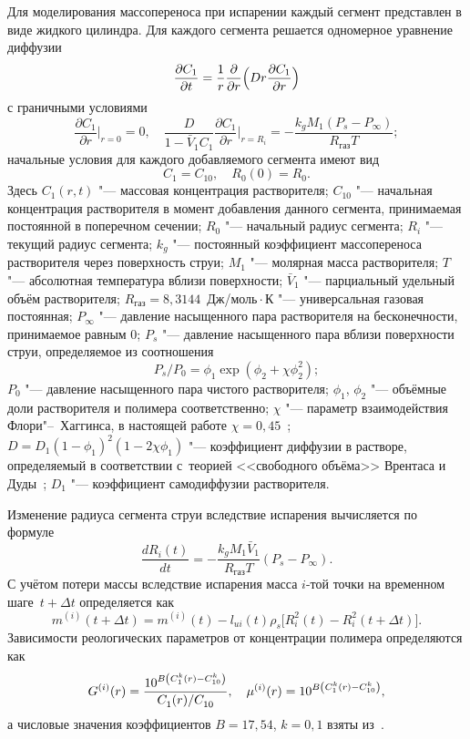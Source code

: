 Для моделирования массопереноса при испарении каждый сегмент представлен в виде жидкого цилиндра. 
Для каждого сегмента решается одномерное уравнение диффузии
\begin{equation}
\label{uravnenie3}
\frac{{\partial C_1 }}{{\partial t}} = \frac{1}{r}\frac{\partial }{{\partial r}}\Bigl( {Dr\frac{{\partial C_1 }}{{\partial r}}} \Bigr)
\end{equation}
с граничными условиями
$$
\frac{{\partial C_1 }}{{\partial r}}\Bigr|_{ r = 0} = 0, \quad
\frac{D}{{1 - \bar V_1 C_1 }}\frac{{\partial C_1 }}{{\partial r}}\Bigr|_{ r = R_i} =  - \frac{{k_g M_1 \left( {P_s  - P_\infty  } \right)}}{{R_{\text{газ}} T}};
$$
начальные условия для каждого добавляемого сегмента имеют вид
$$
C_1  = C_{10} ,\quad R_0 ( 0 ) = R_0.
$$
Здесь $C_1 (r, t)$ "--- массовая концентрация растворителя;
$C_{10}$ "--- начальная концентрация растворителя в момент добавления данного сегмента, принимаемая постоянной в поперечном сечении; 
$R_0$ "--- начальный радиус сегмента; 
$R_i$ "--- текущий радиус сегмента;
$k_g$ "--- постоянный коэффициент массопереноса растворителя через поверхность струи;
$M_1$ "--- молярная масса растворителя;
$T$ "--- абсолютная температура вблизи поверхности;
$\bar V_1$ "--- парциальный удельный объём растворителя;
$R_{\text{газ}}  = 8,3144$~Дж/моль${}\cdot{}$К "--- универсальная газовая постоянная;
$P_\infty$ "--- давление насыщенного пара растворителя на бесконечности, принимаемое равным 0;
$P_s$ "--- давление насыщенного пара вблизи поверхности струи, определяемое из соотношения
$$
P_s /P_0  = \phi _1 \exp ( \phi _2  + \chi \phi _2^2 );
$$
$P_0$ "--- давление насыщенного пара чистого растворителя; 
$\phi _1$, $\phi _2$ "--- объёмные доли растворителя и полимера соответственно; 
$\chi$ "--- параметр взаимодействия Флори"--~Хаггинса, в настоящей работе $\chi  = 0,45$~\cite{salkovskiy:bib:Duda, salkovskiy:bib:Alsoy};
$D = D_1 ( {1 - \phi _1 } )^2 ( {1 - 2\chi \phi _1 } )$ "--- коэффициент диффузии в растворе, определяемый в соответствии с~теорией <<свободного объёма>> Врентаса и Дуды~\cite{salkovskiy:bib:Duda, salkovskiy:bib:Zielinski};
$D_1$ "--- коэффициент самодиффузии растворителя. 

Изменение радиуса сегмента струи вследствие испарения вычисляется по формуле
\begin{equation}
\label{uravnenie5}
\frac{{dR_i (t)}}{{dt}} =  - \frac{{k_g M_1 \bar V{}_1}}{{R_{\text{газ}} T}}( P_s  - P_\infty  ).
\end{equation}
С учётом потери массы вследствие испарения масса $i$-той точки на временном шаге~${t + \Delta t}$ определяется как
$$
m^{( i)} (t + \Delta t) = m^{(i)} (t) - l_{ui} (t)\rho _s \bigl[ R_i^2 (t) - R_i^2 (t + \Delta t) \bigr].
$$
Зависимости реологических параметров от концентрации полимера определяются как
$$
G^{(i)} (r) = \frac{{10^{B\left( {C_1^k (r) - C_{10}^k } \right)} }}{{{{C_1^{} (r)} \mathord{\left/
 {\vphantom {{C_1^{} (r)} {C_{10}^{} }}} \right.
 \kern-\nulldelimiterspace} {C_{10}^{} }}}}, \quad
 \mu ^{(i)} (r) = 10^{B\left( {C_1^k (r) - C_{10}^k } \right)} ,
$$
а числовые значения коэффициентов $B  =  17,54$, $k  =  0,1$ взяты из~\cite{salkovskiy:bib:Yarin}.

